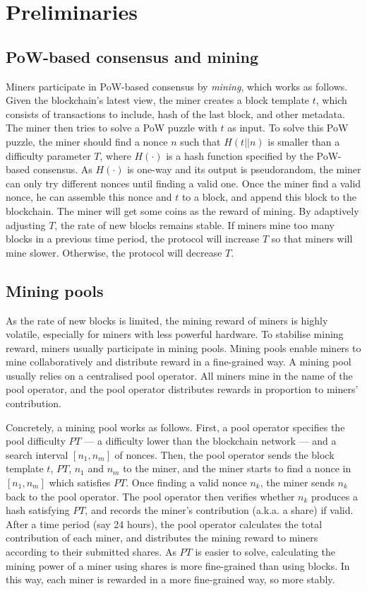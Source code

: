 \section{Preliminaries}
\label{sec:preliminaries}

\subsection{PoW-based consensus and mining}
Miners participate in PoW-based consensus by \emph{mining}, which works as follows.
Given the blockchain's latest view, the miner creates a block template $t$, which consists of transactions to include, hash of the last block, and other metadata.
The miner then tries to solve a PoW puzzle with $t$ as input.
To solve this PoW puzzle, the miner should find a nonce $n$ such that $H(t || n)$ is smaller than a difficulty parameter $T$, where $H(\cdot)$ is a hash function specified by the PoW-based consensus.
As $H(\cdot)$ is one-way and its output is pseudorandom, the miner can only try different nonces until finding a valid one.
Once the miner find a valid nonce, he can assemble this nonce and $t$ to a block, and append this block to the blockchain.
The miner will get some coins as the reward of mining.
By adaptively adjusting $T$, the rate of new blocks remains stable.
If miners mine too many blocks in a previous time period, the protocol will increase $T$ so that miners will mine slower.
Otherwise, the protocol will decrease $T$.

\subsection{Mining pools}
As the rate of new blocks is limited, the mining reward of miners is highly volatile, especially for miners with less powerful hardware.
To stabilise mining reward, miners usually participate in mining pools.
Mining pools enable miners to mine collaboratively and distribute reward in a fine-grained way.
A mining pool usually relies on a centralised pool operator.
All miners mine in the name of the pool operator, and the pool operator distributes rewards in proportion to miners' contribution.

Concretely, a mining pool works as follows.
First, a pool operator specifies the pool difficulty $PT$ --- a difficulty lower than the blockchain network --- and a search interval $[n_1, n_m]$ of nonces.
Then, the pool operator sends the block template $t$, $PT$, $n_1$ and $n_m$ to the miner, and the miner starts to find a nonce in $[n_1, n_m]$ which satisfies $PT$.
Once finding a valid nonce $n_k$, the miner sends $n_k$ back to the pool operator.
The pool operator then verifies whether $n_k$ produces a hash satisfying $PT$, and records the miner's contribution (a.k.a. a share) if valid.
After a time period (say 24 hours), the pool operator calculates the total contribution of each miner, and distributes the mining reward to miners according to their submitted shares.
As $PT$ is easier to solve, calculating the mining power of a miner using shares is more fine-grained than using blocks.
In this way, each miner is rewarded in a more fine-grained way, so more stably.


